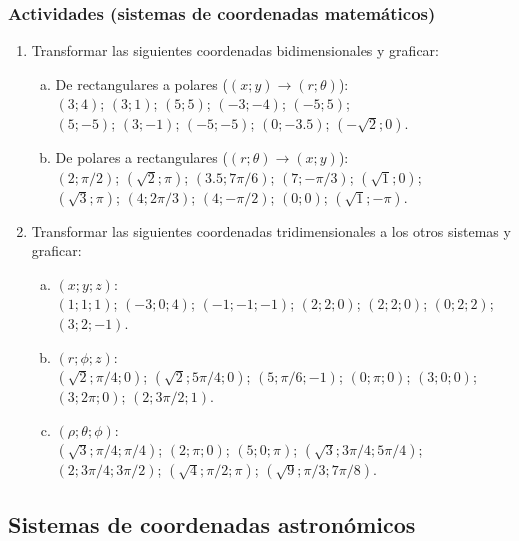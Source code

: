 \subsubsection*{Actividades (sistemas de coordenadas
matemáticos)}
\small
\begin{enumerate}
  \item Transformar las siguientes coordenadas bidimensionales y graficar:
    \begin{enumerate}[a)]
	\item De rectangulares a polares \big($(x;y)\to (r;\theta)$\big):\\
	  $(3;4)$; \quad $(3;1)$; \quad $(5;5)$; \quad $(-3;-4)$; \quad $(-5;5)$;\\ 
          $(5;-5)$; \quad $(3;-1)$; \quad $(-5;-5)$; \quad $(0;-3.5)$; \quad
          $(-\sqrt{2};0)$. 
        \item De polares a rectangulares \big($(r;\theta) \to (x;y)$\big):\\
          $(2;\pi/2)$; \quad $(\sqrt{2};\pi)$; \quad $(3.5;7\pi/6)$; \quad
          $(7;-\pi/3)$; \quad $(\sqrt{1};0)$; \\
          $(\sqrt{3};\pi)$; \quad $(4;2\pi/3)$; \quad $(4;-\pi/2)$; \quad $(0;0)$;
          \quad $(\sqrt{1};-\pi)$.
    \end{enumerate}

  \item Transformar las siguientes coordenadas tridimensionales a los otros
    sistemas y graficar:
    \begin{enumerate}[a)]
      \item $(x;y;z)$: \\
	$(1;1;1)$; \quad $(-3;0;4)$; \quad $(-1;-1;-1)$; \quad $(2;2;0)$; \quad
        $(2;2;0)$; \quad $(0;2;2)$; \quad $(3;2;-1)$.
      \item $(r;\phi;z)$: \\
        $(\sqrt{2};\pi/4;0)$; \quad $(\sqrt{2};5\pi/4;0)$; \quad $(5;\pi/6;-1)$;
	\quad $(0;\pi;0)$; \quad $(3;0;0)$; \quad $(3;2\pi;0)$; \quad $(2;3\pi/2;1)$.
      \item $(\rho;\theta;\phi)$:\\
        $(\sqrt{3};\pi/4;\pi/4)$; \quad $(2;\pi;0)$; \quad $(5;0;\pi)$; \quad
        $(\sqrt{3};3\pi/4;5\pi/4)$; \quad $(2;3\pi/4;3\pi/2)$; \quad
	$(\sqrt{4};\pi/2;\pi)$; \quad $(\sqrt{9};\pi/3;7\pi/8)$.
    \end{enumerate}
\end{enumerate}
\normalsize

\subsection{Sistemas de coordenadas astronómicos}
\label{c.sca}

